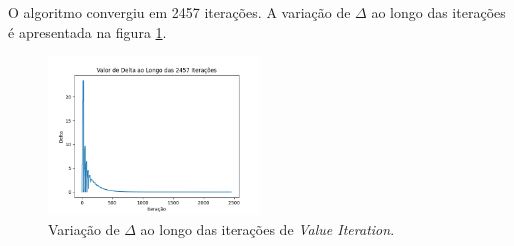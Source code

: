 O algoritmo convergiu em 2457 iterações. A variação de \( \Delta \) ao longo das iterações é apresentada na figura \ref{fig:value_iteration_delta}.

\begin{figure}[H]
    \centering
    \includegraphics[width=0.5\textwidth]{fig/value_iteration_delta.png}
    \caption{Variação de \( \Delta \) ao longo das iterações de \textit{Value Iteration}.}
    \label{fig:value_iteration_delta}
\end{figure}
